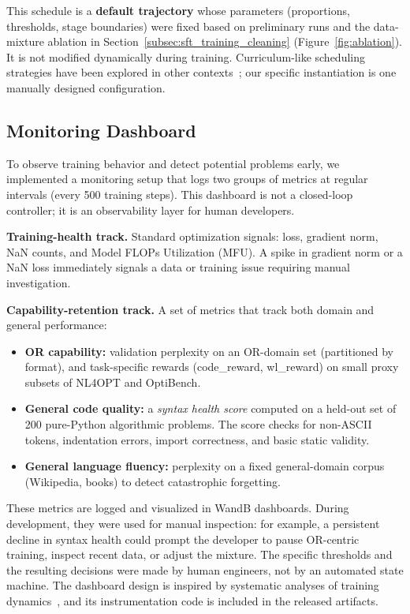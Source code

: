 This schedule is a \textbf{default trajectory} whose parameters (proportions, thresholds, stage boundaries) were fixed based on preliminary runs and the data-mixture ablation in Section~\ref{subsec:sft_training_cleaning} (Figure~\ref{fig:ablation}). It is not modified dynamically during training. Curriculum-like scheduling strategies have been explored in other contexts~\citep{tzannetos2026curriculum,zhao2026rethinking,liang2025boosting}; our specific instantiation is one manually designed configuration.

\subsection{Monitoring Dashboard}

To observe training behavior and detect potential problems early, we implemented a monitoring setup that logs two groups of metrics at regular intervals (every 500 training steps). This dashboard is not a closed-loop controller; it is an observability layer for human developers.

\textbf{Training-health track.} Standard optimization signals: loss, gradient norm, NaN counts, and Model FLOPs Utilization (MFU). A spike in gradient norm or a NaN loss immediately signals a data or training issue requiring manual investigation.

\textbf{Capability-retention track.} A set of metrics that track both domain and general performance:
\begin{itemize}
    \item \textbf{OR capability:} validation perplexity on an OR-domain set (partitioned by format), and task-specific rewards (code\_reward, wl\_reward) on small proxy subsets of NL4OPT and OptiBench.
    \item \textbf{General code quality:} a \textit{syntax health score} computed on a held-out set of 200 pure-Python algorithmic problems. The score checks for non-ASCII tokens, indentation errors, import correctness, and basic static validity.
    \item \textbf{General language fluency:} perplexity on a fixed general-domain corpus (Wikipedia, books) to detect catastrophic forgetting.
\end{itemize}

These metrics are logged and visualized in WandB dashboards. During development, they were used for manual inspection: for example, a persistent decline in syntax health could prompt the developer to pause OR-centric training, inspect recent data, or adjust the mixture. The specific thresholds and the resulting decisions were made by human engineers, not by an automated state machine. The dashboard design is inspired by systematic analyses of training dynamics~\citep{qi2026evolm}, and its instrumentation code is included in the released artifacts.




